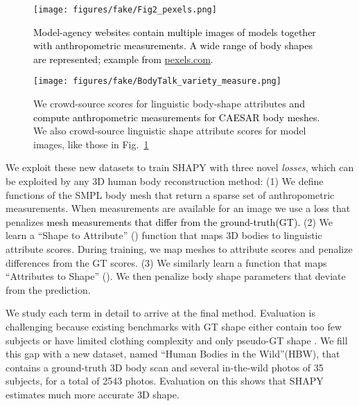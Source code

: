 \documentclass[10pt,twocolumn,letterpaper]{article}
\newcommand{\TODO}[1]{\xspace{\color{red} #1}\xspace}
\renewcommand{\TODO}[1]{\xspace{\color{black} #1}\xspace}
\newcommand{\modelCOLOR}{black}
\newcommand{\modelname}{{\color{\modelCOLOR}SHAPY}\xspace}
\newcommand{\AtoS}{\text{\mbox{A2S}}\xspace}
\newcommand{\StoA}{\text{\mbox{S2A}}\xspace}
\newcommand{\threeD}{3D\xspace}
\newcommand{\hbw}{\mbox{HBW}\xspace}
\newcommand{\hbwLONG}{{``Human Bodies in the Wild''}\xspace}
\newcommand{\colorNUMB}{black}
\newcommand{\hbwNumberSubjects}{{\color{\colorNUMB}35}\xspace}
\newcommand{\hbwNumberPhotos}{{\color{\colorNUMB}2543}\xspace}
\newcommand{\groundtruth}{\mbox{ground-truth}\xspace}
\newcommand{\smpl}{\mbox{SMPL}\xspace}
\newcommand{\caesar}{\mbox{CAESAR}\xspace}
\newcommand{\inthewild}{\mbox{in-the-wild}\xspace}
\newcommand{\cameraready}[1]{\textcolor{Fuchsia}{{#1}}\xspace}
\renewcommand{\cameraready}[1]{\textcolor{black}{{#1}}\xspace}
\newcommand{\colorTERM}{blue}
\renewcommand{\colorTERM}{black}
\newcommand{\measurements}[0]{{\color{\colorTERM}anthropometric measurements}\xspace}
\newcommand{\scores}[0]{{scores}\xspace}
\newcommand{\linguisticattributescores}[0]{{\color{\colorTERM}linguistic attribute \scores}\xspace}
\newcommand{\linguisticshapeattributescores}[0]{{\color{\colorTERM}linguistic shape attribute \scores}\xspace}
\begin{document}
\begin{figure}
    \centering
    \texttt{[image: figures/fake/Fig2\_pexels.png]}
    \caption{\cameraready{Model-agency websites
        contain multiple images of models together with \measurements.  
        A wide range of body shapes are represented;
        example from
        \href{https://www.pexels.com/photo/calm-black-plus-size-woman-against-gray-wall-4986688}{\mbox{pexels.com}}.
        }
    }
    \label{fig:data_eg_metrics}
    \vspace{-0.5em}
\end{figure}
 \begin{figure}
    \centering
    \texttt{[image: figures/fake/BodyTalk\_variety\_measure.png]}
    \caption{
        We crowd-source scores for \TODO{linguistic} 
        body-shape attributes \cite{Streuber:SIGGRAPH:2016} 
        \cameraready{and compute \measurements for  \caesar \cite{CAESAR} body meshes.}
        We also crowd-source 
        \linguisticshapeattributescores
        for model images, like those in Fig.~\ref{fig:data_eg_metrics} 
    }
    \label{fig:data_eg_words}
    \vspace{-0.50em}
\end{figure}
 
We exploit these new datasets to train 
\modelname
with three novel \emph{losses}, 
which can be exploited by any \threeD human body reconstruction method:
(1) We define functions of the \smpl body mesh that return
a sparse set of \TODO{\measurements}.
When measurements are available for an image we use a loss that penalizes \cameraready{mesh measurements that differ from the \groundtruth (GT). } 
(2)     We learn a ``Shape to Attribute'' (\StoA) function that maps \threeD bodies to 
        \linguisticattributescores. 
        During training, we map meshes to attribute \scores and penalize differences from the GT \scores.
(3)     We similarly learn a function that maps ``Attributes to Shape'' (\AtoS).
We then penalize body shape parameters that deviate from the prediction.

We study each term
in detail to arrive at the final method.
Evaluation is challenging because existing benchmarks with GT shape either contain too few subjects \cite{vonMarcard2018} or
have limited clothing complexity and only pseudo-GT shape
\cite{sengupta2020straps}.
We fill this gap with a new dataset, named \hbwLONG (\hbw), that contains a ground-truth \threeD body scan and several \inthewild photos of \hbwNumberSubjects subjects, for a total of \hbwNumberPhotos photos.
Evaluation on this shows that \modelname estimates much more accurate \threeD shape. 
\end{document}
